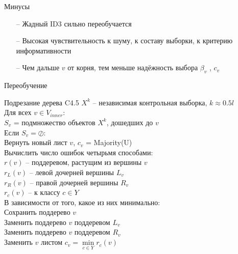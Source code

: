 \documentclass[10pt]{beamer}
\begin{document}
\begin{frame}{Минусы}
	\begin{enumerate} [<+- |alert@+>] 
	\item[--] Жадный ID3 сильно переобучается
	\item[--] Высокая чувствительность к шуму, к составу выборки, к критерию информативности
	\item[--] Чем дальше $v$ от корня, тем меньше надёжность выбора $\beta_v$ , $c_v$
	\end{enumerate}
\end{frame}

\begin{frame}{Переобучение}
\end{frame}

\begin{frame}{Подрезание дерева C4.5}
  $X^k$ -- независимая контрольная выборка, $k \approx 0.5l$\\
	Для всех $v \in V_{inner}$:\\
		\hspace{10mm} $S_v$ = подмножество объектов $X^k$, дошедших до $v$\\
		\hspace{10mm} Если $S_v = \oslash$:\\
		  \hspace{20mm} Вернуть новый лист $v$, $c_v$ = Majority(U)\\
		\hspace{10mm} Вычислить число ошибок четырьмя способами:\\
			\hspace{20mm} $r(v)$ -- поддеревом, растущим из вершины $v$\\
			\hspace{20mm} $r_L(v)$ -- левой дочерней вершины $L_v$\\
			\hspace{20mm} $r_R(v)$ -- правой дочерней вершины $R_v$\\
			\hspace{20mm} $r_c(v)$ -- к классу $c \in Y$\\
		\hspace{10mm} В зависимости от того, какое из них минимально:\\
			\hspace{20mm} Сохранить поддерево $v$\\
			\hspace{20mm} Заменить поддерево $v$ поддеревом $L_v$\\
			\hspace{20mm} Заменить поддерево $v$ поддеревом $R_v$\\
			\hspace{20mm} Заменить $v$ листом $c_v = \min\limits_{c \in Y} r_c(v)$\\
\end{frame}
\end{document}
